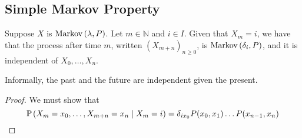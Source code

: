 \subsection{Simple Markov Property}
\begin{theorem}
	Suppose \( X \) is \( \operatorname{Markov}\left({\lambda, P}\right) \).
	Let \( m \in \mathbb N \) and \( i \in I \).
	Given that \( X_m = i \), we have that the process after time \( m \), written \( (X_{m+n})_{n \geq 0} \), is \( \operatorname{Markov}\left({\delta_i, P}\right) \), and it is independent of \( X_0, \dots, X_n \).
\end{theorem}
\noindent Informally, the past and the future are independent given the present.
\begin{proof}
	We must show that
	\[
		\mathbb{P}\left({X_m = x_0, \dots, X_{m+n} = x_n \mid X_m = i}\right) = \delta_{i x_0} P(x_0, x_1) \dots P(x_{n-1}, x_n)
	\]
\end{proof}

